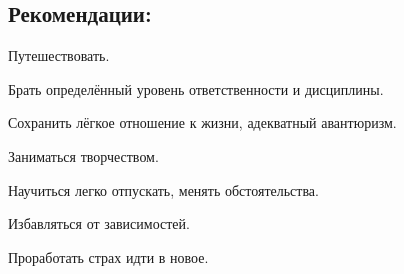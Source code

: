 \subsection{Рекомендации:}
\item Путешествовать.
\item Брать определённый уровень ответственности и дисциплины.
\item Сохранить лёгкое отношение к жизни, адекватный авантюризм.
\item Заниматься творчеством.
\item Научиться легко отпускать, менять обстоятельства.
\item Избавляться от зависимостей.
\item Проработать страх идти в новое.
\endsubsection

\endsection
